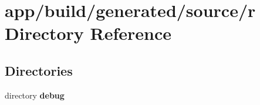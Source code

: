 \section{app/build/generated/source/r Directory Reference}
\label{dir_4ba189ccc459f4f97f57284707a060e0}
\subsection*{Directories}
\begin{DoxyCompactItemize}
\item 
directory {\bf debug}
\end{DoxyCompactItemize}
